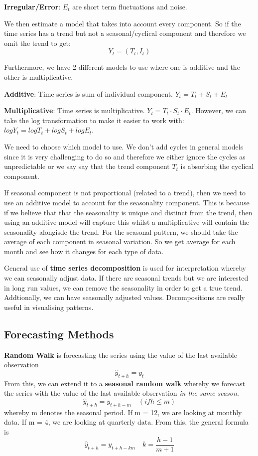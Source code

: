 \documentclass[11pt, oneside]{article}
\theoremstyle{definition}
\begin{document}
\textbf{Irregular/Error}: $E_t$ are short term fluctuations and noise.

We then estimate a model that takes into account every component. So if the time series has a trend but not a seasonal/cyclical component and therefore we omit the trend to get:
$$
Y_t = (T_t,I_t)
$$

Furthermore, we have 2 different models to use where one is additive and the other is multiplicative.

\textbf{Additive}: Time series is sum of individual component. $Y_t = T_t + S_t + E_t$

\textbf{Multiplicative}: Time series is multiplicative. $Y_t = T_t \cdot S_t \cdot E_t$. However, we can take the log transformation to make it easier to work with: $log Y_t = logT_t + logS_t + logE_t$.

We need to choose which model to use. We don't add cycles in general models since it is very challenging to do so and therefore we either ignore the cycles as unpredictable or we say say that the trend component $T_t$ is absorbing the cyclical component.

If seasonal component is not proportional (related to a trend), then we need to use an additive model to account for the seasonality component. This is because if we believe that that the seasonality is unique and distinct from the trend, then using an additive model will capture this whilst a multiplicative will contain the seasonality alongisde the trend. For the seasonal pattern, we should take the average of each component in seasonal variation. So we get average for each month and see how it changes for each type of data.

General use of \textbf{time series decomposition} is used for interpretation whereby we can seasonally adjust data. If there are seasonal trends but we are interested in long run values, we can remove the seasonality in order to get a true trend. Addtionally, we can have seasonally adjusted values. Decompositions are really useful in visualising patterns.

\subsection{Forecasting Methods}

\textbf{Random Walk} is forecasting the series using the value of the last available observation
$$
\hat{y}_{t+h} = y_t
$$
From this, we can extend it to a \textbf{seasonal random walk} whereby we forecast the series with the value of the last available observation \textit{in the same season}.
$$
\hat{y}_{t+h} = y_{t+h-m} \quad (if h \leq m)
$$
whereby m denotes the seasonal period. If m = 12, we are looking at monthly data. If m = 4, we are looking at quarterly data. From this, the general formula is
$$
\hat{y}_{t+h} = y_{t+h-km} \quad k = \frac{h-1}{m+1}
$$
\end{document}
